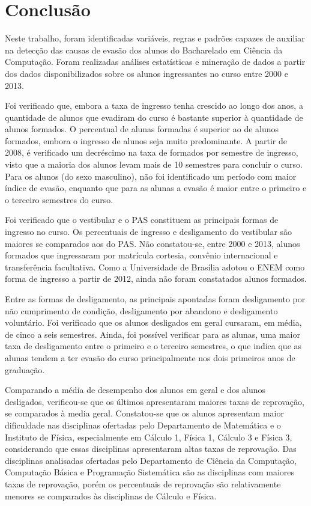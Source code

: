 

\chapter{Conclusão} \label{chapter7}

Neste trabalho, foram identificadas variáveis, regras e padrões capazes de auxiliar na detecção das causas de evasão dos alunos do Bacharelado em Ciência da Computação. Foram realizadas análises estatísticas e mineração de dados a partir dos dados disponibilizados sobre os alunos ingressantes no curso entre 2000 e 2013.

Foi verificado que, embora a taxa de ingresso tenha crescido ao longo dos anos, a quantidade de alunos que evadiram do curso é bastante superior à quantidade de alunos formados. O percentual de alunas formadas é superior ao de alunos formados, embora o ingresso de alunos seja muito predominante. A partir de 2008, é verificado um decréscimo na taxa de formados por semestre de ingresso, visto que a maioria dos alunos levam mais de 10 semestres para concluir o curso. Para os alunos (do sexo masculino), não foi identificado um período com maior índice de evasão, enquanto que para as alunas a evasão é maior entre o primeiro e o terceiro semestres do curso.

Foi verificado que o vestibular e o PAS constituem as principais formas de ingresso no curso. Os percentuais de ingresso e desligamento do vestibular são maiores se comparados aos do PAS. Não constatou-se, entre 2000 e 2013, alunos formados que ingressaram por matrícula cortesia, convênio internacional e transferência facultativa. Como a Universidade de Brasília adotou o ENEM como forma de ingresso a partir de 2012, ainda não foram constatados alunos formados. 

Entre as formas de desligamento, as principais apontadas foram desligamento por não cumprimento de condição, desligamento por abandono e desligamento voluntário. Foi verificado que os alunos  desligados em geral cursaram, em média, de cinco a seis semestres. Ainda, foi possível verificar para as alunas, uma maior taxa de desligamento entre o primeiro e o terceiro semestres, o que indica que as alunas tendem a ter evasão do curso principalmente nos dois primeiros anos de graduação.

Comparando a média de desempenho dos alunos em geral e dos alunos desligados, verificou-se que os últimos apresentaram maiores taxas de reprovação, se comparados à media geral. Constatou-se que os alunos apresentam maior dificuldade nas disciplinas ofertadas pelo Departamento de Matemática e o Instituto de Física, especialmente em Cálculo 1, Física 1, Cálculo 3 e Física 3, considerando que essas disciplinas apresentaram altas taxas de reprovação. Das disciplinas analisadas ofertadas pelo Departamento de Ciência da Computação, Computação Básica e Programação Sistemática são as disciplinas com maiores taxas de reprovação, porém os percentuais de reprovação são relativamente menores se comparados às disciplinas de Cálculo e Física.
 
